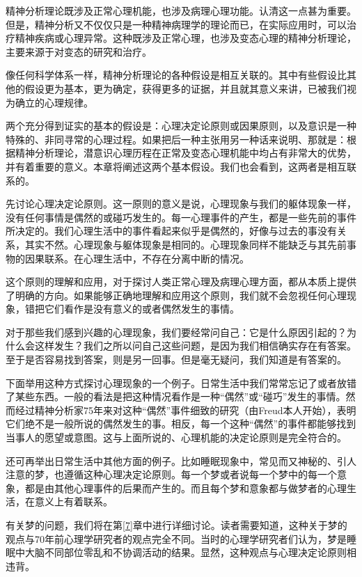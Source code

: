 \documentclass[UTF8,10pt,a4paper,openany]{book}
\begin{document}
精神分析理论既涉及正常心理机能，也涉及病理心理功能。认清这一点甚为重要。但是，精神分析又不仅仅只是一种精神病理学的理论而已，在实际应用时，可以治疗精神疾病或心理异常。这种既涉及正常心理，也涉及变态心理的精神分析理论，主要来源于对变态的研究和治疗。

像任何科学体系一样，精神分析理论的各种假设是相互关联的。其中有些假设比其他的假设更为基本，更为确定，获得更多的证据，并且就其意义来讲，已被我们视为确立的心理规律。

两个充分得到证实的基本的假设是：心理决定论原则或因果原则，以及意识是一种特殊的、非同寻常的心理过程。如果把后一种主张用另一种话来说明、那就是：根据精神分析理论，潜意识心理历程在正常及变态心理机能中均占有非常大的优势，并有着重要的意义。本章将阐述这两个基本假设。我们也会看到，这两者是相互联系的。

先讨论心理决定论原则。这一原则的意义是说，心理现象与我们的躯体现象一样，没有任何事情是偶然的或碰巧发生的。每一心理事件的产生，都是一些先前的事件所决定的。我们心理生活中的事件看起来似乎是偶然的，好像与过去的事没有关系，其实不然。心理现象与躯体现象是相同的。心理现象同样不能缺乏与其先前事物的因果联系。在心理生活中，不存在分离中断的情况。

这个原则的理解和应用，对于探讨人类正常心理及病理心理方面，都从本质上提供了明确的方向。如果能够正确地理解和应用这个原则，我们就不会忽视任何心理现象，错把它们看作是没有意义的或者偶然发生的事情。

对于那些我们感到兴趣的心理现象，我们要经常问自己：它是什么原因引起的？为什么会这样发生？我们之所以问自己这些问题，是因为我们相信确实存在有答案。至于是否容易找到答案，则是另一回事。但是毫无疑问，我们知道是有答案的。

下面举用这种方式探讨心理现象的一个例子。日常生活中我们常常忘记了或者放错了某些东西。一般的看法是把这种情况看作是一种“偶然”或“碰巧”发生的事情。然而经过精神分析家75年来对这种“偶然”事件细致的研究（由Freud本人开始），表明它们绝不是一般所说的偶然发生的事。相反，每一个这种“偶然”的事件都能够找到当事人的愿望或意图。这与上面所说的、心理机能的决定论原则是完全符合的。

还可再举出日常生活中其他方面的例子。比如睡眠现象中，常见而又神秘的、引人注意的梦，也遵循这种心理决定论原则。每一个梦或者说每一个梦中的每一个意象，都是由其他心理事件的后果而产生的。而且每个梦和意象都与做梦者的心理生活，在意义上有着联系。

有关梦的问题，我们将在第\ref{7}章中进行详细讨论。读者需要知道，这种关于梦的观点与70年前心理学研究者的观点完全不同。当时的心理学研究者们认为，梦是睡眠中大脑不同部位零乱和不协调活动的结果。显然，这种观点与心理决定论原则相违背。
\end{document}
